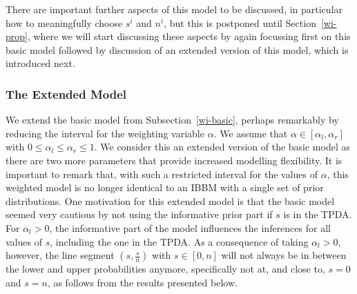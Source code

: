 There are important further aspects of this model to be discussed,
in particular how to meaningfully choose $s^i$ and $n^i$, but this
is postponed until Section~\ref{wi-prop}, where we will start
discussing these aspects by again focussing first on this basic
model followed by discussion of an extended version of this model,
which is introduced next.


\subsubsection{The Extended Model}
\label{wi-ext}

We extend the basic model from Subsection~\ref{wi-basic}, perhaps
remarkably by reducing the interval for the weighting variable
$\alpha$. We assume that $\alpha \in [\alpha_l,\alpha_r]$ with $0
\leq \alpha_l \leq \alpha_r \leq 1$. We consider this an extended
version of the basic model as there are two more parameters that
provide increased modelling flexibility. It is important to remark
that, with such a restricted interval for the values of $\alpha$,
this weighted model is no longer identical to an IBBM
with a single set of prior distributions. One
motivation for this extended model is that the basic
model seemed very cautious by not using the
informative prior part if $s$ is in the TPDA. For $\alpha_l>0$,
the informative part of the model influences the
inferences for all values of $s$, including the one in the TPDA. As
a consequence of taking $\alpha_l>0$, however, the line segment
$(s,\frac{s}{n})$ with $s\in [0,n]$ will not always be in between the lower and upper
probabilities anymore, specifically not at, and close to, $s=0$ and
$s=n$, as follows from the results presented below.

